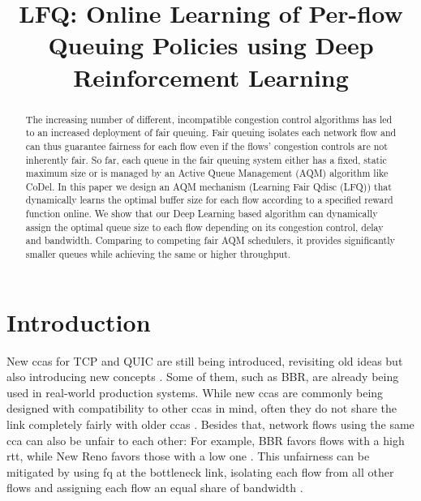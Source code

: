 \documentclass[conference]{IEEEtran}
\begin{document}
\title{LFQ: Online Learning of Per-flow Queuing Policies using Deep Reinforcement Learning}

\author{
}

\maketitle

\begin{abstract}
The increasing number of different, incompatible congestion control algorithms has led to an increased deployment of fair queuing. Fair queuing isolates each network flow and can thus guarantee fairness for each flow even if the flows' congestion controls are not inherently fair. So far, each queue in the fair queuing system either has a fixed, static maximum size or is managed by an Active Queue Management (AQM) algorithm like CoDel. In this paper we design an AQM mechanism (Learning Fair Qdisc (LFQ)) that dynamically learns the optimal buffer size for each flow according to a specified reward function online. We show that our Deep Learning based algorithm can dynamically assign the optimal queue size to each flow depending on its congestion control, delay and bandwidth. Comparing to competing fair AQM schedulers, it provides significantly smaller queues while achieving the same or higher throughput. 
\end{abstract}

\section{Introduction}
\label{sec:intro}

New \glspl{cca} for TCP and QUIC are still being introduced, revisiting old ideas but also introducing new concepts \cite{dong_pcc_2018, cardwell_bbr:_2016, hock_tcp_2017, bachl_rax_2019, jay_deep_2019}. Some of them, such as BBR, are already being used in real-world production systems. While new \glspl{cca} are commonly being designed with compatibility to other \glspl{cca} in mind, often they do not share the link completely fairly with older \glspl{cca} \cite{hock_experimental_2017, fejes_who_2019, fejes_incompatibility_2020}. Besides that, network flows using the same \gls{cca} can also be unfair to each other: For example, BBR favors flows with a high \gls{rtt}, while New Reno favors those with a low one \cite{turkovic_interactions_2019,turkovic_fifty_2019}. This unfairness can be mitigated by using \gls{fq} at the bottleneck link, isolating each flow from all other flows and assigning each flow an equal share of bandwidth \cite{dumazet_pkt_sched:_2013}. 
\end{document}
